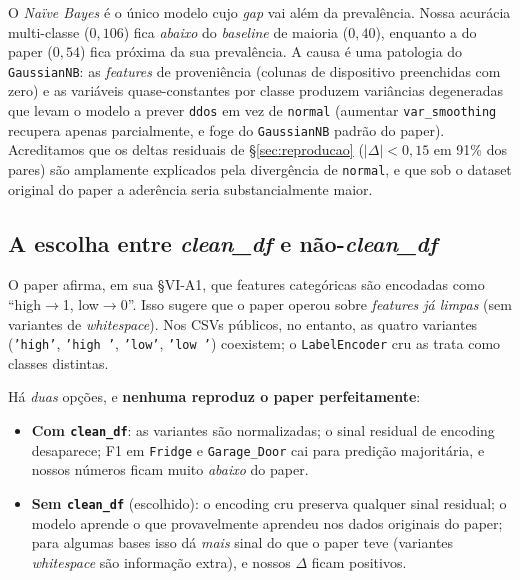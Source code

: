 O \emph{Naïve Bayes} é o único modelo cujo \emph{gap} vai além da
prevalência. Nossa acurácia multi-classe ($0{,}106$) fica \emph{abaixo}
do \emph{baseline} de maioria ($0{,}40$), enquanto a do paper ($0{,}54$)
fica próxima da sua prevalência. A causa é uma patologia do
\texttt{GaussianNB}: as \emph{features} de proveniência (colunas de
dispositivo preenchidas com zero) e as variáveis quase-constantes por
classe produzem variâncias degeneradas que levam o modelo a prever
\texttt{ddos} em vez de \texttt{normal} (aumentar \texttt{var\_smoothing}
recupera apenas parcialmente, e foge do \texttt{GaussianNB} padrão do
paper). Acreditamos que os deltas residuais de \S{}\ref{sec:reproducao}
($|\Delta|<0{,}15$ em 91\% dos pares) são amplamente explicados pela
divergência de \texttt{normal}, e que sob o dataset original do paper a
aderência seria substancialmente maior.

\subsection{A escolha entre \emph{clean\_df} e não-\emph{clean\_df}}
\label{sec:discussao_clean}

O paper afirma, em sua \S{}VI-A1, que features categóricas são
encodadas como ``high$\rightarrow$1, low$\rightarrow$0''. Isso
sugere que o paper operou sobre \emph{features já limpas} (sem
variantes de \emph{whitespace}). Nos CSVs públicos, no entanto, as
quatro variantes (\texttt{'high'}, \texttt{'high\ '},
\texttt{'low'}, \texttt{'low\ '}) coexistem; o
\texttt{LabelEncoder} cru as trata como classes distintas.

Há \emph{duas} opções, e \textbf{nenhuma reproduz o paper
perfeitamente}:

\begin{itemize}[leftmargin=*,itemsep=0pt]
  \item \textbf{Com \texttt{clean\_df}}: as variantes são
        normalizadas; o sinal residual de encoding desaparece;
        F1 em \texttt{Fridge} e \texttt{Garage\_Door} cai para
        predição majoritária, e nossos números ficam muito
        \emph{abaixo} do paper.
  \item \textbf{Sem \texttt{clean\_df}} (escolhido): o encoding cru
        preserva qualquer sinal residual; o modelo aprende o que
        provavelmente aprendeu nos dados originais do paper;
        para algumas bases isso dá \emph{mais} sinal do que o paper
        teve (variantes \emph{whitespace} são informação extra),
        e nossos $\Delta$ ficam positivos.
\end{itemize}

